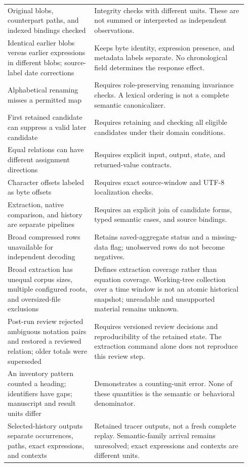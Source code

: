 \documentclass[11pt,letterpaper]{article}
\theoremstyle{definition}\newtheorem{definition}[theorem]{Definition}
\begin{document}
\begin{longtable}{p{0.34\linewidth}p{0.60\linewidth}}
Original blobs, counterpart paths, and indexed bindings checked & Integrity checks with different units. These are not summed or interpreted as independent observations.\\[4pt]
Identical earlier blobs versus earlier expressions in different blobs; source-label date corrections & Keeps byte identity, expression presence, and metadata labels separate. No chronological field determines the response effect.\\[4pt]
Alphabetical renaming misses a permitted map & Requires role-preserving renaming invariance checks. A lexical ordering is not a complete semantic canonicalizer.\\[4pt]
First retained candidate can suppress a valid later candidate & Requires retaining and checking all eligible candidates under their domain conditions.\\[4pt]
Equal relations can have different assignment directions & Requires explicit input, output, state, and returned-value contracts.\\[4pt]
Character offsets labeled as byte offsets & Requires exact source-window and UTF-8 localization checks.\\[4pt]
Extraction, native comparison, and history are separate pipelines & Requires an explicit join of candidate forms, typed semantic cases, and source bindings.\\[4pt]
Broad compressed rows unavailable for independent decoding & Retains saved-aggregate status and a missing-data flag; unobserved rows do not become negatives.\\[4pt]
Broad extraction has unequal corpus sizes, multiple configured roots, and oversized-file exclusions & Defines extraction coverage rather than equation coverage. Working-tree collection over a time window is not an atomic historical snapshot; unreadable and unsupported material remains unknown.\\[4pt]
Post-run review rejected ambiguous notation pairs and restored a reviewed relation; older totals were superseded & Requires versioned review decisions and reproducibility of the retained state. The extraction command alone does not reproduce this review step.\\[4pt]
An inventory pattern counted a heading; identifiers have gaps; manuscript and result units differ & Demonstrates a counting-unit error. None of these quantities is the semantic or behavioral denominator.\\[4pt]
Selected-history outputs separate occurrences, paths, exact expressions, and contexts & Retained tracer outputs, not a fresh complete replay. Semantic-family arrival remains unresolved; exact expressions and contexts are different units.\\[4pt]

\end{longtable}
\end{document}
